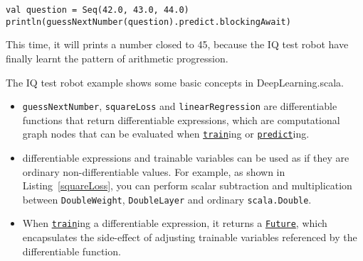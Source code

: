\begin{lstlisting}[float={h t b p},caption={Inference on a trained model},label={predict_trained}]
val question = Seq(42.0, 43.0, 44.0)
println(guessNextNumber(question).predict.blockingAwait)
\end{lstlisting}

This time, it will prints a number closed to 45, because the IQ test robot have finally learnt the pattern of arithmetic progression.

The IQ test robot example shows some basic concepts in DeepLearning.scala.

\begin{itemize}
  \item \lstinline{guessNextNumber}, \lstinline{squareLoss} and \lstinline{linearRegression} are \glspl{differentiable function} that return \glspl{differentiable expression}, which are \gls{computational graph} nodes that can be evaluated when \href{https://javadoc.io/page/com.thoughtworks.deeplearning/deeplearning_2.11/latest/com/thoughtworks/deeplearning/DeepLearning.html#train(differentiable:Differentiable)(implicitmonoid:algebra.ring.MultiplicativeMonoid[DeepLearning.this.Delta]):com.thoughtworks.future.Future[DeepLearning.this.Data]}{\lstinline{train}}ing or \href{https://javadoc.io/page/com.thoughtworks.deeplearning/deeplearning_2.11/latest/com/thoughtworks/deeplearning/DeepLearning.html#predict(differentiable:Differentiable):com.thoughtworks.future.Future[DeepLearning.this.Data]}{\lstinline{predict}}ing.
  \item \Glspl{differentiable expression} and \glspl{trainable variable} can be used as if they are ordinary non-differentiable values. For example, as shown in Listing~\ref{squareLoss}, you can perform scalar subtraction and multiplication between \lstinline{DoubleWeight}, \lstinline{DoubleLayer} and ordinary \lstinline{scala.Double}.
  \item When \href{https://javadoc.io/page/com.thoughtworks.deeplearning/deeplearning_2.11/latest/com/thoughtworks/deeplearning/DeepLearning.html#train(differentiable:Differentiable)(implicitmonoid:algebra.ring.MultiplicativeMonoid[DeepLearning.this.Delta]):com.thoughtworks.future.Future[DeepLearning.this.Data]}{\lstinline{train}}ing a \gls{differentiable expression}, it returns a \href{https://javadoc.io/page/com.thoughtworks.future/future_2.11/latest/com/thoughtworks/future%24%24Future.html}{\lstinline{Future}}, which encapsulates the side-effect of adjusting \glspl{trainable variable} referenced by the \gls{differentiable function}.

\end{itemize}

